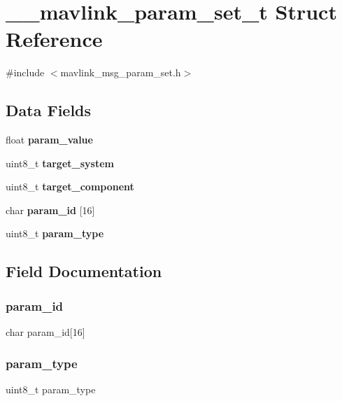 \section{\+\_\+\+\_\+mavlink\+\_\+param\+\_\+set\+\_\+t Struct Reference}
\label{struct____mavlink__param__set__t}


{\ttfamily \#include $<$mavlink\+\_\+msg\+\_\+param\+\_\+set.\+h$>$}

\subsection*{Data Fields}
\begin{DoxyCompactItemize}
\item 
float \textbf{ param\+\_\+value}
\item 
uint8\+\_\+t \textbf{ target\+\_\+system}
\item 
uint8\+\_\+t \textbf{ target\+\_\+component}
\item 
char \textbf{ param\+\_\+id} [16]
\item 
uint8\+\_\+t \textbf{ param\+\_\+type}
\end{DoxyCompactItemize}


\subsection{Field Documentation}
\mbox{\label{struct____mavlink__param__set__t_a3167e09cdc92f9b6981b87379d5fd336}} 
\subsubsection{param\+\_\+id}
{\footnotesize\ttfamily char param\+\_\+id[16]}

\mbox{\label{struct____mavlink__param__set__t_abf9b2e7d047fcff69a1be3eb0c0d091e}} 
\subsubsection{param\+\_\+type}
{\footnotesize\ttfamily uint8\+\_\+t param\+\_\+type}

